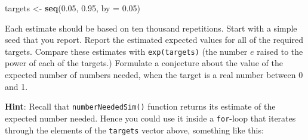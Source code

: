 \documentclass[]{book}
\makeatletter
\newenvironment{Shaded}{\begin{snugshade}}{\end{snugshade}}
\newcommand{\KeywordTok}[1]{\textcolor[rgb]{0.13,0.29,0.53}{\textbf{#1}}}
\newcommand{\DataTypeTok}[1]{\textcolor[rgb]{0.13,0.29,0.53}{#1}}
\newcommand{\FloatTok}[1]{\textcolor[rgb]{0.00,0.00,0.81}{#1}}
\newcommand{\StringTok}[1]{\textcolor[rgb]{0.31,0.60,0.02}{#1}}
\newcommand{\NormalTok}[1]{#1}
\newenvironment{kframe}{%
\medskip{}
\setlength{\fboxsep}{.8em}
 \def\at@end@of@kframe{}%
 \ifinner\ifhmode%
  \def\at@end@of@kframe{\end{minipage}}%
  \begin{minipage}{\columnwidth}%
 \fi\fi%
 \def\FrameCommand##1{\hskip\@totalleftmargin \hskip-\fboxsep
 \colorbox{shadecolor}{##1}\hskip-\fboxsep
     \hskip-\linewidth \hskip-\@totalleftmargin \hskip\columnwidth}%
 \MakeFramed {\advance\hsize-\width
   \@totalleftmargin\z@ \linewidth\hsize
   \@setminipage}}%
 {\par\unskip\endMakeFramed%
 \at@end@of@kframe}
\renewenvironment{Shaded}{\begin{kframe}}{\end{kframe}}
\theoremstyle{definition}
\theoremstyle{definition}
\theoremstyle{definition}
\theoremstyle{remark}
\makeatother
\begin{document}
{\begin{enumerate}
\begin{Shaded}
\begin{Highlighting}[]
\NormalTok{targets <-}\StringTok{ }\KeywordTok{seq}\NormalTok{(}\FloatTok{0.05}\NormalTok{, }\FloatTok{0.95}\NormalTok{, }\DataTypeTok{by =} \FloatTok{0.05}\NormalTok{)}
\end{Highlighting}
\end{Shaded}

  Each estimate should be based on ten thousand repetitions. Start with
  a simple seed that you report. Report the estimated expected values
  for all of the required targets. Compare these estimates with
  \texttt{exp(targets)} (the number \(e\) raised to the power of each of
  the targets.) Formulate a conjecture about the value of the expected
  number of numbers needed, when the target is a real number between 0
  and 1.

  \textbf{Hint}: Recall that \texttt{numberNeededSim()} function returns
  its estimate of the expected number needed. Hence you could use it
  inside a \texttt{for}-loop that iterates through the elements of the
  \texttt{targets} vector above, something like this:


\end{enumerate}}
\end{document}
